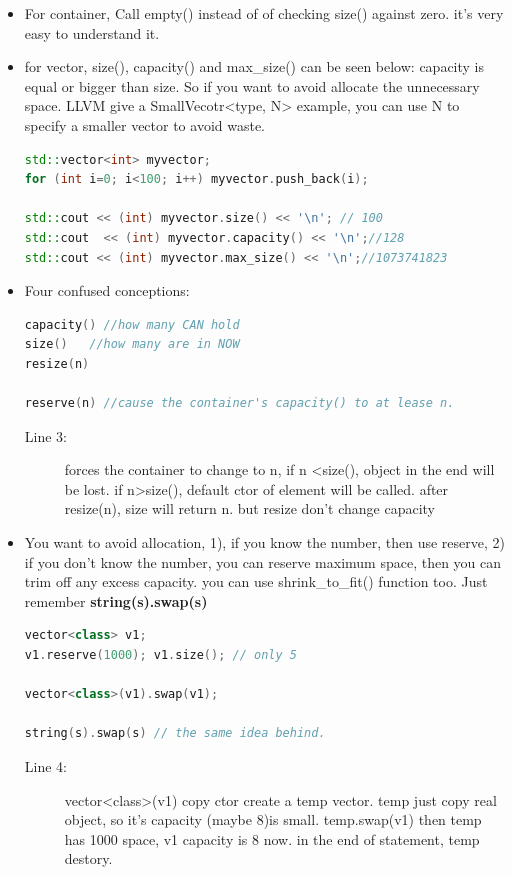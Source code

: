 \documentclass[a4paper,11pt,twoside]{book}
\begin{document}
\begin{itemize}
\item For container, Call empty() instead of of checking size() against zero. it's very easy to understand it.

\item for vector, size(), capacity() and max\_size() can be seen below: capacity is equal or bigger than size. So if you want to avoid allocate the unnecessary space.  LLVM give a SmallVecotr<type, N> example, you can use N to specify a smaller vector to avoid waste.
\begin{lstlisting}[frame=single, language=c++]
std::vector<int> myvector;
for (int i=0; i<100; i++) myvector.push_back(i);

std::cout << (int) myvector.size() << '\n'; // 100
std::cout  << (int) myvector.capacity() << '\n';//128
std::cout << (int) myvector.max_size() << '\n';//1073741823
\end{lstlisting}


\item Four confused conceptions:
\begin{lstlisting}[frame=single, language=c++]
capacity() //how many CAN hold
size()   //how many are in NOW
resize(n) 

reserve(n) //cause the container's capacity() to at lease n.
\end{lstlisting}
\begin{description}
	\item[Line 3:] forces the container to change to n, if n <size(),  object in the end will be lost. if n>size(),  default ctor of element will be called. after resize(n), size will return n. but resize don't change capacity
\end{description}

\item You want to avoid allocation, 1), if you know the number, then use reserve, 2) if you don't know the number, you can reserve maximum space, then you can trim off any excess capacity.  you can use shrink\_to\_fit() function too. Just remember \textbf{string(s).swap(s)}
\begin{lstlisting}[frame=single, language=c++]
vector<class> v1;
v1.reserve(1000); v1.size(); // only 5

vector<class>(v1).swap(v1);

string(s).swap(s) // the same idea behind.
\end{lstlisting}
\begin{description}
	\item[Line 4:] vector<class>(v1) copy ctor create a temp vector. temp just copy real object, so it's capacity (maybe 8)is small. temp.swap(v1) then temp has 1000 space,  v1 capacity is 8 now. in the end of statement, temp destory.
\end{description}


\end{itemize}
\end{document}
